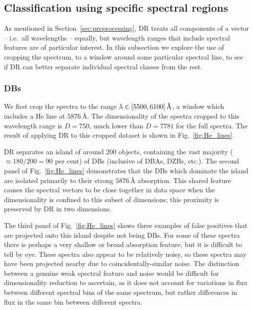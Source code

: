 \documentclass[fleqn,usenatbib]{mnras}
\begin{document}
\subsection{Classification using specific spectral regions}
\label{sec:zoom}

As mentioned in Section~\ref{sec:preprocessing}, DR treats all components of a vector -- i.e.\ all wavelengths -- equally, but wavelength ranges that include spectral features are of particular interest.
In this subsection we explore the use of cropping the spectrum, to a window around some particular spectral line, to see if DR can better separate individual spectral classes from the rest.

\subsubsection{DBs}
\label{sec:DBs}

We first crop the spectra to the range $\lambda \in \qty[5500, 6100]\,\text{\AA}$, a window which includes a He line at $5876\,\text{\AA}$.
The dimensionality of the spectra cropped to this wavelength range is $D=750$, much lower than $D=7781$ for the full spectra.
The result of applying DR to this cropped dataset is shown in Fig.~\ref{fig:He_lines}.

DR separates an island of around 200 objects, containing the vast majority ($\approx 180/200=90$ per cent) of DBs (inclusive of DBAs, DZBs, etc.).
The second panel of Fig.~\ref{fig:He_lines} demonstrates that the DBs which dominate the island are isolated primarily to their strong $5876\,\text{\AA}$ absorption.
This shared feature causes the spectral vectors to be close together in data space when the dimensionality is confined to this subset of dimensions; this proximity is preserved by DR in two dimensions.

The third panel of Fig.~\ref{fig:He_lines} shows three examples of false positives that are projected onto this island despite not being DBs.
For some of these spectra there is perhaps a very shallow or broad absorption feature, but it is difficult to tell by eye.
These spectra also appear to be relatively noisy, so these spectra may have been projected nearby due to coincidentally-similar noise.
The distinction between a genuine weak spectral feature and noise would be difficult for dimensionality reduction to ascertain, as it does not account for variations in flux between different spectral bins of the same spectrum, but rather differences in flux in the same bin between different spectra.
\end{document}
